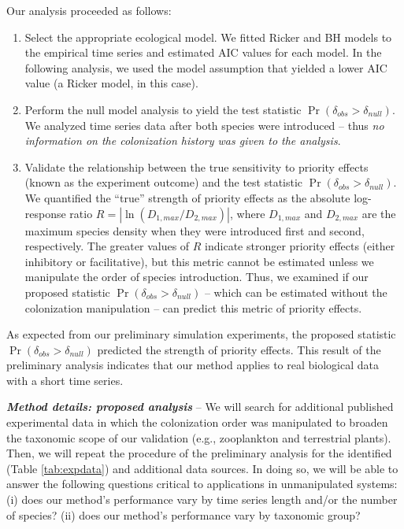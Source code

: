 \documentclass[12pt, class=article, crop=false]{standalone}
\begin{document}
Our analysis proceeded as follows:

\begin{enumerate}
    \item Select the appropriate ecological model.
    We fitted Ricker and BH models to the empirical time series and estimated AIC values for each model.
    In the following analysis, we used the model assumption that yielded a lower AIC value (a Ricker model, in this case).
    \item Perform the null model analysis to yield the test statistic $\Pr(\delta_{obs} > \delta_{null})$.
    We analyzed time series data after both species were introduced -- thus \textit{no information on the colonization history was given to the analysis}.
    \item Validate the relationship between the true sensitivity to priority effects (known as the experiment outcome) and the test statistic $\Pr(\delta_{obs} > \delta_{null})$.
    We quantified the ``true'' strength of priority effects as the absolute log-response ratio $R = |\ln (D_{1, max} / D_{2, max})|$, where $D_{1, max}$ and $D_{2, max}$ are the maximum species density when they were introduced first and second, respectively.
    The greater values of $R$ indicate stronger priority effects (either inhibitory or facilitative), but this metric cannot be estimated unless we manipulate the order of species introduction.
    Thus, we examined if our proposed statistic $\Pr(\delta_{obs} > \delta_{null})$ -- which can be estimated without the colonization manipulation -- can predict this metric of priority effects.
\end{enumerate}

As expected from our preliminary simulation experiments, the proposed statistic $\Pr(\delta_{obs} > \delta_{null})$ predicted the strength of priority effects.
This result of the preliminary analysis indicates that our method applies to real biological data with a short time series.


\textit{\textbf{Method details: proposed analysis}} --
We will search for additional published experimental data in which the colonization order was manipulated to broaden the taxonomic scope of our validation (e.g., zooplankton and terrestrial plants).
Then, we will repeat the procedure of the preliminary analysis for the identified (Table \ref{tab:expdata}) and additional data sources. 
In doing so, we will be able to answer the following questions critical to applications in unmanipulated systems: (i) does our method's performance vary by time series length and/or the number of species? (ii) does our method's performance vary by taxonomic group?
\end{document}
